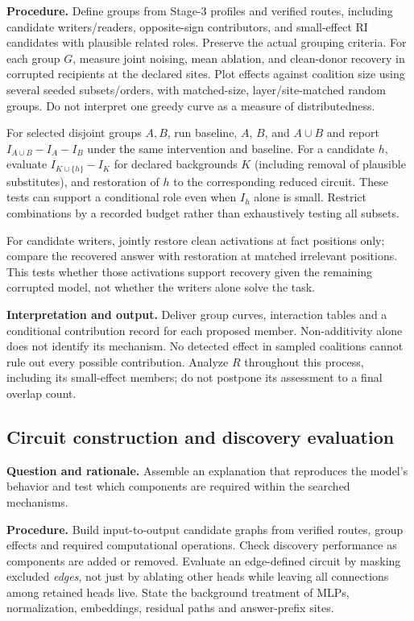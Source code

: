 \documentclass[11pt,a4paper]{article}
\newcommand{\purpose}{\textbf{Question and rationale.} }
\newcommand{\procedure}{\textbf{Procedure.} }
\newcommand{\interpretation}{\textbf{Interpretation and output.} }
\begin{document}
\procedure Define groups from Stage-3 profiles and verified routes, including
candidate writers/readers, opposite-sign contributors, and small-effect RI
candidates with plausible related roles. Preserve the actual grouping criteria.
For each group $G$, measure joint noising, mean ablation, and clean-donor
recovery in corrupted recipients at the declared sites. Plot effects against
coalition size using several seeded subsets/orders, with matched-size,
layer/site-matched random groups. Do not interpret one greedy curve as a
measure of distributedness.

For selected disjoint groups $A,B$, run baseline, $A$, $B$, and $A\cup B$ and
report $I_{A\cup B}-I_A-I_B$ under the same intervention and baseline. For a
candidate $h$, evaluate $I_{K\cup\{h\}}-I_K$ for declared backgrounds $K$
(including removal of plausible substitutes), and restoration of $h$ to the
corresponding reduced circuit. These tests can support a conditional role even
when $I_h$ alone is small. Restrict combinations by a recorded budget rather
than exhaustively testing all subsets.

For candidate writers, jointly restore clean activations at fact positions
only; compare the recovered answer with restoration at matched irrelevant
positions. This tests whether those activations support recovery given the
remaining corrupted model, not whether the writers alone solve the task.

\interpretation Deliver group curves, interaction tables and a conditional
contribution record for each proposed member. Non-additivity alone does not
identify its mechanism. No detected effect in sampled coalitions cannot rule
out every possible contribution. Analyze $R$ throughout this process, including
its small-effect members; do not postpone its assessment to a final overlap count.

\subsection{Circuit construction and discovery evaluation}
\purpose Assemble an explanation that reproduces the model's behavior and
test which components are required within the searched mechanisms.

\procedure Build input-to-output candidate graphs from verified routes, group
effects and required computational operations. Check discovery performance as
components are added or removed. Evaluate an edge-defined circuit by masking
excluded \emph{edges}, not just by ablating other heads while leaving all
connections among retained heads live. State the background treatment of
MLPs, normalization, embeddings, residual paths and answer-prefix sites.
\end{document}

